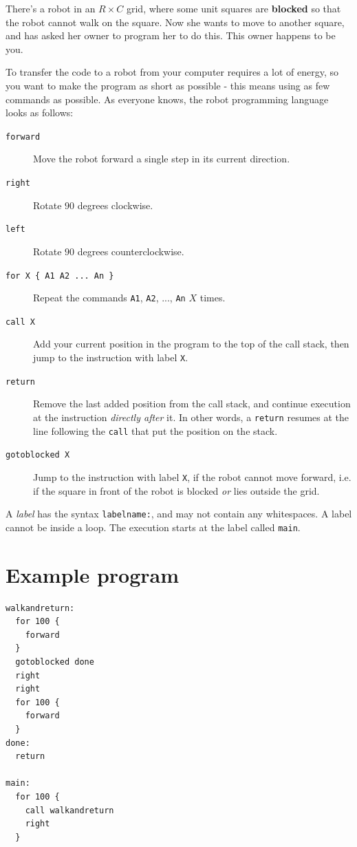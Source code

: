 
There's a robot in an $R \times C$ grid, where some unit squares are \textbf{blocked} so that the robot cannot walk on the square. Now she wants to move to another square, and has asked her owner to program her to do this.
This owner happens to be you.

To transfer the code to a robot from your computer requires a lot of energy, so you want to make the program as short as possible - this means using as few commands as possible.
As everyone knows, the robot programming language looks as follows:

\begin{description}
  \item[\texttt{forward}] Move the robot forward a single step in its current direction.
  \item[\texttt{right}] Rotate $90$ degrees clockwise.
  \item[\texttt{left}] Rotate $90$ degrees counterclockwise.
  \item[\texttt{for X \{ A1 A2 ... An \}}] Repeat the commands \texttt{A1}, \texttt{A2}, ..., \texttt{An} $X$ times.
  \item[\texttt{call X}] Add your current position in the program to the top of the call stack, then jump to the instruction with label \texttt{X}.
  \item[\texttt{return}] Remove the last added position from the call stack, and continue execution at the instruction \emph{directly after} it. In other words, a \texttt{return} resumes at the line following the \texttt{call} that put the position on the stack.
  \item[\texttt{gotoblocked X}] Jump to the instruction with label \texttt{X}, if the robot cannot move forward, i.e. if the square in front of the robot is blocked \emph{or} lies outside the grid.
\end{description}

A \emph{label} has the syntax \texttt{labelname:}, and may not contain any whitespaces. A label cannot be inside a loop. The execution starts at the label called \texttt{main}.

\section*{Example program}

\begin{verbatim}
walkandreturn:
  for 100 {
    forward
  }
  gotoblocked done
  right
  right
  for 100 {
    forward
  }
done:
  return

main:
  for 100 {
    call walkandreturn
    right
  }
\end{verbatim}

